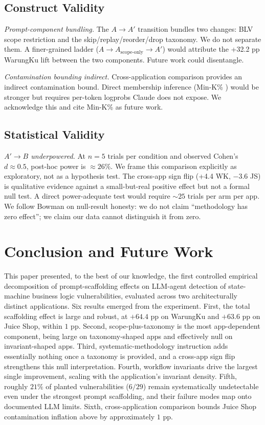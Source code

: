 \documentclass[conference]{IEEEtran}
\begin{document}
\subsection{Construct Validity}

\textit{Prompt-component bundling.} The $A \to A'$ transition bundles two changes: BLV scope restriction and the skip/replay/reorder/drop taxonomy. We do not separate them. A finer-grained ladder ($A \to A_\text{scope-only} \to A'$) would attribute the +32.2 pp WarungKu lift between the two components. Future work could disentangle.

\textit{Contamination bounding indirect.} Cross-application comparison provides an indirect contamination bound. Direct membership inference (Min-K\% \cite{shi2024detect}) would be stronger but requires per-token logprobs Claude does not expose. We acknowledge this and cite Min-K\% as future work.

\subsection{Statistical Validity}

\textit{$A' \to B$ underpowered.} At $n = 5$ trials per condition and observed Cohen's $d \approx 0.5$, post-hoc power is $\approx 26\%$. We frame this comparison explicitly as exploratory, not as a hypothesis test. The cross-app sign flip (+4.4 WK, $-3.6$ JS) is qualitative evidence against a small-but-real positive effect but not a formal null test. A direct power-adequate test would require $\sim 25$ trials per arm per app. We follow Bowman \cite{bowman2022underclaiming} on null-result honesty: we do not claim ``methodology has zero effect''; we claim our data cannot distinguish it from zero.

\section{Conclusion and Future Work}
\label{sec:conclusion}

This paper presented, to the best of our knowledge, the first controlled empirical decomposition of prompt-scaffolding effects on LLM-agent detection of state-machine business logic vulnerabilities, evaluated across two architecturally distinct applications. Six results emerged from the experiment. First, the total scaffolding effect is large and robust, at $+64.4$ pp on WarungKu and $+63.6$ pp on Juice Shop, within $1$ pp. Second, scope-plus-taxonomy is the most app-dependent component, being large on taxonomy-shaped apps and effectively null on invariant-shaped apps. Third, systematic-methodology instruction adds essentially nothing once a taxonomy is provided, and a cross-app sign flip strengthens this null interpretation. Fourth, workflow invariants drive the largest single improvement, scaling with the application's invariant density. Fifth, roughly $21\%$ of planted vulnerabilities ($6/29$) remain systematically undetectable even under the strongest prompt scaffolding, and their failure modes map onto documented LLM limits. Sixth, cross-application comparison bounds Juice Shop contamination inflation above by approximately $1$ pp.
\end{document}
